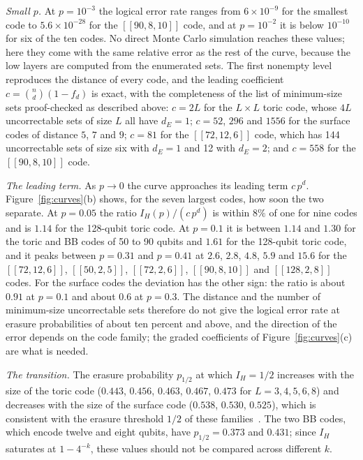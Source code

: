 \documentclass[11pt]{article}
\theoremstyle{remark}
\begin{document}
\emph{Small \(p\).} At \(p=10^{-3}\) the logical error rate ranges from
\(6\times10^{-9}\) for the smallest code to \(5.6\times10^{-28}\) for the
\([[90,8,10]]\) code, and at \(p=10^{-2}\) it is below \(10^{-10}\) for
six of the ten codes. No direct Monte Carlo simulation reaches these
values; here they come with the same relative error as the rest of the
curve, because the low layers are computed from the enumerated sets. The
first nonempty level reproduces the distance of every code, and the
leading coefficient \(c=\binom nd(1-f_d)\) is exact, with the
completeness of the list of minimum-size sets proof-checked as described
above: \(c=2L\) for the
\(L\times L\) toric code, whose \(4L\) uncorrectable sets of size \(L\)
all have \(d_E=1\); \(c=52\), \(296\) and \(1556\) for the surface codes
of distance \(5\), \(7\) and \(9\); \(c=81\) for the \([[72,12,6]]\) code,
which has 144 uncorrectable sets of size six with \(d_E=1\) and 12 with
\(d_E=2\); and \(c=558\) for the \([[90,8,10]]\) code.

\emph{The leading term.} As \(p\to0\) the curve approaches its leading
term \(c\,p^d\). Figure~\ref{fig:curves}(b) shows, for the seven largest
codes, how soon the two separate. At \(p=0.05\) the ratio \(I_H(p)/(c\,p^d)\) is within
\(8\%\) of one for nine codes and is \(1.14\) for the 128-qubit toric
code. At \(p=0.1\) it is between \(1.14\) and \(1.30\) for the toric and
BB codes of 50 to 90 qubits and \(1.61\) for the 128-qubit toric code,
and it peaks between \(p=0.31\) and \(p=0.41\) at \(2.6\), \(2.8\),
\(4.8\), \(5.9\) and \(15.6\) for the \([[72,12,6]]\), \([[50,2,5]]\),
\([[72,2,6]]\), \([[90,8,10]]\) and \([[128,2,8]]\) codes. For the
surface codes the deviation has the other sign: the ratio is about
\(0.91\) at \(p=0.1\) and about \(0.6\) at \(p=0.3\). The distance and the
number of minimum-size uncorrectable sets therefore do not give the
logical error rate at erasure probabilities of about ten percent and
above, and the direction of the error depends on the code family; the graded
coefficients of Figure~\ref{fig:curves}(c) are what is needed.

\emph{The transition.} The erasure probability \(p_{1/2}\) at which
\(I_H=1/2\) increases with the size of the toric
code (\(0.443\), \(0.456\), \(0.463\), \(0.467\), \(0.473\) for
\(L=3,4,5,6,8\)) and decreases with the size of the surface code
(\(0.538\), \(0.530\), \(0.525\)), which is consistent with the erasure
threshold \(1/2\) of these families~\cite{stace2009}. The two BB codes,
which encode twelve and eight qubits, have \(p_{1/2}=0.373\) and
\(0.431\); since \(I_H\) saturates at \(1-4^{-k}\), these values should
not be compared across different \(k\).
\end{document}
